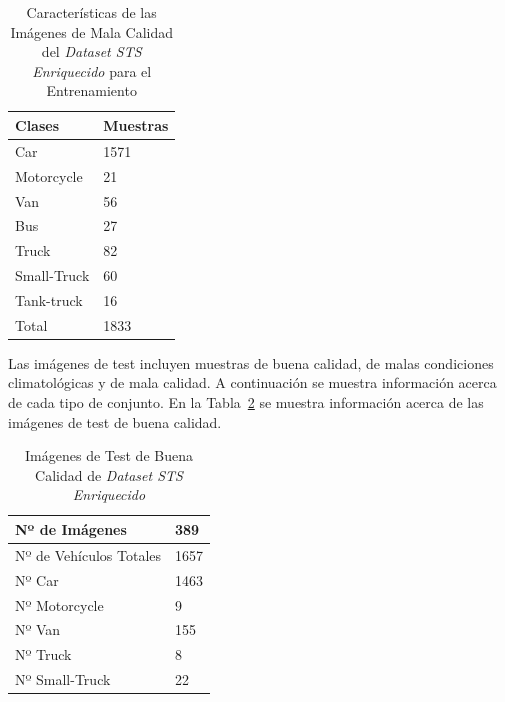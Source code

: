 \begin{table}[H]
\begin{center}
\begin{tabular}{|l|l|}
\hline
Clases & Muestras \\
\hline \hline
Car & 1571 \\ \hline
Motorcycle & 21 \\ \hline
Van & 56 \\ \hline
Bus & 27 \\ \hline
Truck & 82 \\ \hline
Small-Truck & 60 \\ \hline
Tank-truck & 16 \\ \hline
Total & 1833 \\ \hline
\end{tabular}
\caption{Características de las Imágenes de Mala Calidad del \textit{Dataset STS Enriquecido} para el Entrenamiento}
\label{tabla_redes_database_mala_calidad}
\end{center}
\end{table}

Las imágenes de test incluyen muestras de buena calidad, de malas condiciones climatológicas y de mala calidad. A continuación se muestra información acerca de cada tipo de conjunto. En la Tabla~\ref{tab_img_test_buenas} se muestra información acerca de las imágenes de test de buena calidad.
\begin{table}[H] 
\begin{center}
\begin{tabular}{|l|l|}
\hline
Nº de Imágenes  & 389 \\
\hline \hline
Nº de Vehículos Totales & 1657\\ \hline
Nº Car & 1463 \\ \hline
Nº Motorcycle & 9 \\ \hline
Nº Van & 155 \\ \hline
Nº Truck & 8 \\ \hline
Nº Small-Truck & 22 \\ \hline
\end{tabular}
\caption{Imágenes de Test de Buena Calidad de \textit{Dataset STS Enriquecido}}
\label{tab_img_test_buenas}
\end{center}
\end{table}

